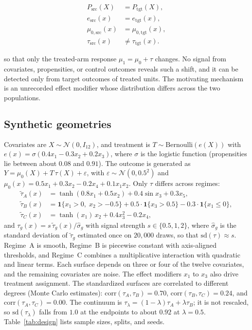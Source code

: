 \documentclass[pdflatex,sn-mathphys-num]{sn-jnl}
\begin{document}
\begin{equation}
\label{eq:geometry-shift}
\begin{aligned}
P_{\mathrm{src}}(X)
    &= P_{\mathrm{tgt}}(X),\\
e_{\mathrm{src}}(x)
    &= e_{\mathrm{tgt}}(x),\\
\mu_{0,\mathrm{src}}(x)
    &= \mu_{0,\mathrm{tgt}}(x),\\
\tau_{\mathrm{src}}(x)
    &\ne \tau_{\mathrm{tgt}}(x).
\end{aligned}
\end{equation}

so that only the treated-arm response $\mu_1=\mu_0+\tau$ changes. No signal from covariates, propensities, or control outcomes reveals such a shift, and it can be detected only from target outcomes of treated units. The motivating mechanism is an unrecorded effect modifier whose distribution differs across the two populations.

\subsection{Synthetic geometries}
Covariates are $X\sim\mathcal N(0,I_{12})$, and treatment is $T\sim\mathrm{Bernoulli}(e(X))$ with $e(x)=\sigma(0.4x_1-0.3x_2+0.2x_3)$, where $\sigma$ is the logistic function (propensities lie between about $0.08$ and $0.91$). The outcome is generated as ${Y=\mu_0(X)+T\,\tau(X)+\varepsilon}$, with $\varepsilon\sim\mathcal N(0,0.5^2)$ and $\mu_0(x)=0.5x_1+0.3x_2-0.2x_4+0.1x_1x_2$. Only $\tau$ differs across regimes:
\begin{align}
\tilde\tau_A(x)&=\tanh(0.8x_1+0.5x_2)+0.4\sin x_3+0.3x_5,\\
\tilde\tau_B(x)&=\mathbf 1\{x_1>0,\;x_2>-0.5\}+0.5\cdot\mathbf 1\{x_3>0.5\}-0.3\cdot\mathbf 1\{x_1\le 0\},\\
\tilde\tau_C(x)&=\tanh(x_1)\,x_2+0.4x_3^2-0.2x_4,
\end{align}
and $\tau_g(x)=s\,\tilde\tau_g(x)/\hat\sigma_g$ with signal strength $s\in\{0.5,1,2\}$, where $\hat\sigma_g$ is the standard deviation of $\tilde\tau_g$ estimated once on $20{,}000$ draws, so that $\mathrm{sd}(\tau)\approx s$. Regime~A is smooth, Regime~B is piecewise constant with axis-aligned thresholds, and Regime~C combines a multiplicative interaction with quadratic and linear terms. Each surface depends on three or four of the twelve covariates, and the remaining covariates are noise. The effect modifiers $x_1$ to $x_3$ also drive treatment assignment. The standardized surfaces are correlated to different degrees (Monte Carlo estimates): $\mathrm{corr}(\tau_A,\tau_B)=0.70$, $\mathrm{corr}(\tau_B,\tau_C)=0.24$, and $\mathrm{corr}(\tau_A,\tau_C)=0.00$. The continuum is $\tau_\lambda=(1-\lambda)\tau_A+\lambda\tau_B$; it is not rescaled, so $\mathrm{sd}(\tau_\lambda)$ falls from $1.0$ at the endpoints to about $0.92$ at $\lambda=0.5$. Table~\ref{tab:design} lists sample sizes, splits, and seeds.
\end{document}
